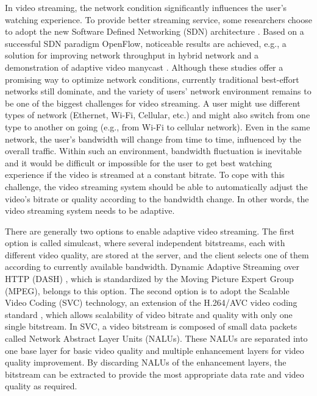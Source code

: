 \documentclass[journal]{IEEEtran}
\begin{document}
In video streaming, the network condition significantly influences the user's watching experience. To provide better streaming service, some researchers choose to adopt the new Software Defined Networking (SDN) architecture \cite{Egilmez14}. Based on a successful SDN paradigm OpenFlow, noticeable results are achieved, e.g., a solution for improving network throughput in hybrid network \cite{Li14} and a demonstration of adaptive video manycast \cite{Xue15}. Although these studies offer a promising way to optimize network conditions, currently traditional best-effort networks still dominate, and the variety of users' network environment remains to be one of the biggest challenges for video streaming. A user might use different types of network (Ethernet, Wi-Fi, Cellular, etc.) and might also switch from one type to another on going (e.g., from Wi-Fi to cellular network). Even in the same network, the user's bandwidth will change from time to time, influenced by the overall traffic. Within such an environment, bandwidth fluctuation is inevitable and it would be difficult or impossible for the user to get best watching experience if the video is streamed at a constant bitrate. To cope with this challenge, the video streaming system should be able to automatically adjust the video's bitrate or quality according to the bandwidth change. In other words, the video streaming system needs to be adaptive.

There are generally two options to enable adaptive video streaming. The first option is called simulcast, where several independent bitstreams, each with different video quality, are stored at the server, and the client selects one of them according to currently available bandwidth. Dynamic Adaptive Streaming over HTTP (DASH) \cite{DASH}, which is standardized by the Moving Picture Expert Group (MPEG), belongs to this option. The second option is to adopt the Scalable Video Coding (SVC) \cite{SVC} technology, an extension of the H.264/AVC video coding standard \cite{SVCOverview}, which allows scalability of video bitrate and quality with only one single bitstream. In SVC, a video bitstream is composed of small data packets called Network Abstract Layer Units (NALUs). These NALUs are separated into one base layer for basic video quality and multiple enhancement layers for video quality improvement. By discarding NALUs of the enhancement layers, the bitstream can be extracted to provide the most appropriate data rate and video quality as required.
\end{document}
